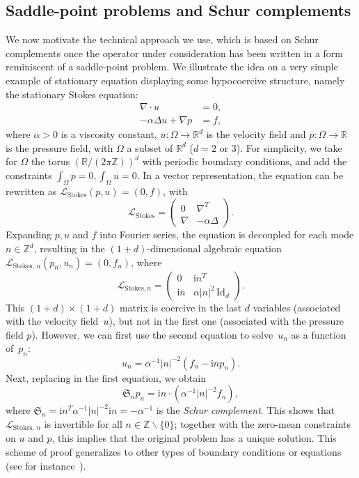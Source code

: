 \documentclass[10pt]{amsart}
\theoremstyle{definition}\newtheorem{defi}[theo]{Definition}\newtheorem{rema}[theo]{Remark}\newtheorem{exam}[theo]{Example}\newtheorem{exem}[theo]{Example}\newtheorem{nota}[theo]{Notation}
\newcommand{\ri}{\mathrm{i}}
\newcommand{\Id}{\mathrm{Id}}
\newcommand{\Stokes}{\mathrm{Stokes}}
\newcommand{\cL}{\mathcal{L}}
\newcommand{\R}{\mathbb{R}}
\newcommand{\bbZ}{\mathbb{Z}}
\newcommand{\frkS}{\mathfrak{S}}
\begin{document}
\subsection*{Saddle-point problems and Schur complements}
We now motivate the technical approach we use, which is based on Schur complements once the operator under consideration has been written in a form reminiscent of a saddle-point problem. We illustrate the idea on a very simple example of stationary equation displaying some hypocoercive structure, namely the stationary Stokes equation:
\begin{align*}
\nabla\cdot u &= 0, \\
-\alpha \Delta u + \nabla p &= f,
\end{align*}
where $\alpha > 0$ is a viscosity constant, $u : \Omega \to \R^{d}$ is the velocity field and $p : \Omega \to \R$ is the pressure field, with $\Omega$ a subset of $\R^{d}$ ($d = 2$ or $3$). For simplicity, we take for $\Omega$ the torus $(\R/(2\pi\bbZ))^{d}$ with periodic boundary conditions, and add the constraints $\int_{\Omega} p =0, \int_{\Omega} u = 0$. In a vector representation, the equation can be rewritten as $\cL_{\Stokes} (p,u) = (0,f)$, with
\[
\cL_{\Stokes} =
\begin{pmatrix}
0 & \nabla^{T}\\
\nabla & -\alpha \Delta
\end{pmatrix}.
\]
Expanding $p,u$ and $f$ into Fourier series, the equation is decoupled for each mode $n \in \bbZ^{d}$, resulting in the $(1+d)$-dimensional algebraic equation $\cL_{\Stokes,\,n} (p_{n},u_{n}) = (0,f_{n})$, where
\[
\cL_{{\Stokes},n} =
\begin{pmatrix}
0 & \ri n^{T}\\
\ri n & \alpha |n|^{2}\, {\Id}_{d}
\end{pmatrix}.
\]
This $(1+d)\times (1+d)$ matrix is coercive in the last $d$ variables (associated with the velocity field~$u$), but not in the first one (associated with the pressure field $p$). However, we can first use the second equation to solve~$u_{n}$ as a function of~$p_{n}$:
\[
u_{n} = \alpha^{-1} |n|^{-2}\left(f_{n} - \ri n p_{n}\right).
\]
Next, replacing in the first equation, we obtain
\[
\frkS_n p_{n} = \ri n \cdot \left(\alpha^{-1} |n|^{-2} f_{n}\right),
\]
where $\frkS_n = \ri n^{T} \alpha^{-1} |n|^{-2} \ri n = -\alpha^{-1}$ is the \emph{Schur complement}. This shows that $\cL_{{\Stokes},\,n}$ is invertible for all $n \in \bbZ \backslash \{0\}$; together with the zero-mean constraints on $u$ and $p$, this implies that the original problem has a unique solution. This scheme of proof generalizes to other types of boundary conditions or equations (see for instance~\cite[Section~2.4]{ern2013theory}).
\end{document}

